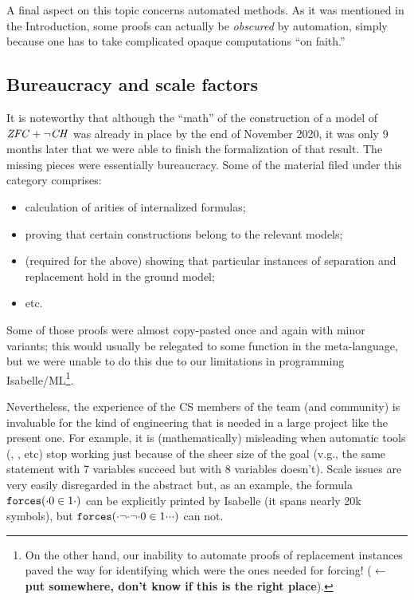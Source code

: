 A final aspect on this topic concerns automated methods. As it was
mentioned in the Introduction, some proofs can actually be
\emph{obscured} by automation, simply because one has to take
complicated opaque computations “on faith.”

\subsection{Bureaucracy and scale factors}

It is noteworthy that although the “math” of the construction of a
model of $\mathit{ZFC}+\neg\mathit{CH}$ was already in place by the end of November
2020, it was only 9 months later that we were able to finish the
formalization of that result. The missing pieces were essentially
bureaucracy. Some of the material filed under this category comprises:
\begin{itemize}
\item calculation of arities of internalized formulas;
\item proving that certain constructions belong to the relevant
  models;
\item (required for the above) showing that particular instances of
  separation and replacement hold in the ground model;
\item etc.
\end{itemize}

Some of those proofs were almost copy-pasted once and again with minor
variants; this would usually be relegated to some function in the
meta-language, but we were unable to do this due to our limitations in
programming Isabelle/ML\footnote{%
  On the other hand, our inability to automate proofs of replacement
  instances paved the way for identifying which were the ones needed for
  forcing! ($\leftarrow$\textbf{put somewhere, don't know if this is the right
    place}).}.

Nevertheless, the experience of the CS members of the team (and
community) is invaluable for the kind of engineering that is needed in
a large project like the present one. For example, it is
(mathematically) misleading when automatic tools (,
, etc) stop working just because of the sheer size of the
goal (v.g., the same statement with 7 variables succeed but with 8
variables doesn't). Scale issues are very easily disregarded in the
abstract but, as an example, the formula $\mathop{\mathtt{forces}}({\cdot}0\in 1{\cdot})$
can be explicitly printed by Isabelle (it spans nearly 20k symbols), but
$\mathop{\mathtt{forces}}({\cdot}\neg{\cdot}\neg{\cdot}0\in 1{\cdot}{\cdot}{\cdot})$
can not.

